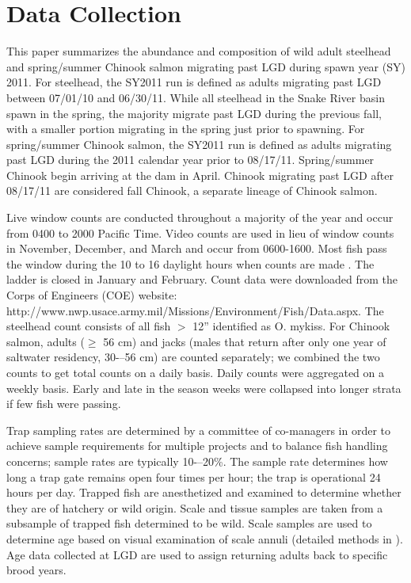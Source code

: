 \documentclass[12pt]{article}
\begin{document}
\section{Data Collection}
This paper summarizes the abundance and composition of wild adult steelhead and spring/summer Chinook salmon migrating past LGD during spawn year (SY) 2011. For steelhead, the SY2011 run is defined as adults migrating past LGD between 07/01/10 and 06/30/11. While all steelhead in the Snake River basin spawn in the spring, the majority migrate past LGD during the previous fall, with a smaller portion migrating in the spring just prior to spawning. For spring/summer Chinook salmon, the SY2011 run is defined as adults migrating past LGD during the 2011 calendar year prior to 08/17/11. Spring/summer Chinook begin arriving at the dam in April. Chinook migrating past LGD after 08/17/11 are considered fall Chinook, a separate lineage of Chinook salmon.

Live window counts are conducted throughout a majority of the year and occur from 0400 to 2000 Pacific Time. Video counts are used in lieu of window counts in November, December, and March and occur from 0600-1600. Most fish pass the window during the 10 to 16 daylight hours when counts are made \cite{Cassinelli2012}. The ladder is closed in January and February. Count data were downloaded from the Corps of Engineers (COE) website: http://www.nwp.usace.army.mil/Missions/Environment/Fish/Data.aspx. The steelhead count consists of all fish $>$ 12'' identified as O. mykiss. For Chinook salmon, adults ($\geq$ 56 cm) and jacks (males that return after only one year of saltwater residency, 30-–56 cm) are counted separately; we combined the two counts to get total counts on a daily basis. Daily counts were aggregated on a weekly basis. Early and late in the season weeks were collapsed into longer strata if few fish were passing.

Trap sampling rates are determined by a committee of co-managers in order to achieve sample requirements for multiple projects and to balance fish handling concerns; sample rates are typically 10-–20\%. The sample rate determines how long a trap gate remains open four times per hour; the trap is operational 24 hours per day. Trapped fish are anesthetized and examined to determine whether they are of hatchery or wild origin. Scale and tissue samples are taken from a subsample of trapped fish determined to be wild. Scale samples are used to determine age based on visual examination of scale annuli (detailed methods in ). Age data collected at LGD are used to assign returning adults back to specific brood years.
\end{document}
